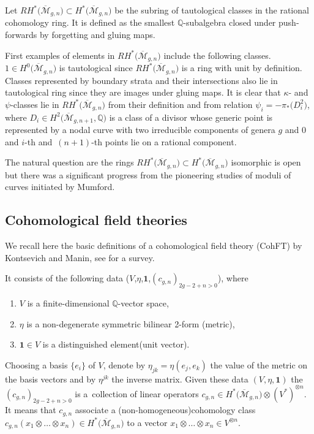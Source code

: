\documentclass[10pt,a4paper]{amsart}
\def\oM{\overline{\mathcal{M}}}
\def\b1{{\mathbf 1}}
\numberwithin{equation}{section}
\begin{document}
Let
$
RH^*\big(\oM_{g,n}\big) \subset H^*\big(\oM_{g,n}\big)
$
be the subring of tautological
classes in the rational cohomology ring. It is defined as the smallest $\mathbb{Q}$-subalgebra closed under push-forwards by forgetting and gluing maps.

First examples of elements in $RH^*\big(\oM_{g,n}\big)$ include the following classes.
$1\in H^{0}\big(\oM_{g,n}\big)$ is tautological since $RH^*\big(\oM_{g,n}\big)$ is a ring with unit by definition. Classes represented by boundary strata and their intersections also lie in tautological ring since they are images under gluing maps.
It is clear that $\kappa$- and $\psi$-classes lie in $RH^*\big(\oM_{g,n}\big)$ from their definition and from relation $\psi_i = - \pi_{*}\big(D^{2}_{i}\big)$, where $D_i \in H^{2}\big(\oM_{g,n+1},\mathbb{Q}\big)$ is a class of a divisor whose generic point is represented by a nodal curve with two irreducible components of genera $g$ and $0$ and
$i$-th and~$(n+1)$-th points lie on a rational component.

The natural question are the rings $RH^*\big(\oM_{g,n}\big) \subset H^*\big(\oM_{g,n}\big)$ isomorphic is open but there was a significant progress from the pioneering studies of moduli of curves initiated by Mumford.

\subsection{Cohomological field theories} \label{cft}
We recall here the basic definitions of a cohomological field theory (CohFT) by Kontsevich and Manin, see \cite{PPP} for a survey.

It consists of the following data ($V$,$\eta$,$\b1$,$(c_{g,n})_{2g-2+n>0}$), where
\begin{enumerate}\itemsep=0pt
\item[(i)] $V$ is a finite-dimensional $\mathbb{Q}$-vector space,
\item[(ii)]$\eta$ is a non-degenerate symmetric bilinear 2-form (metric),
\item[(iii)]$\b1\in V$ is a distinguished element(unit vector).
\end{enumerate}

Choosing a basis $\{e_i\}$ of $V$, denote by $\eta_{jk}=\eta(e_j,e_k)$ the value of the metric on the basis vectors and by $\eta^{jk}$ the inverse matrix.
Given these data $(V,\eta,\b1)$ the $(c_{g,n})_{2g-2+n > 0}$ is a~collection of linear operators
$c_{g,n} \in H^*\big(\oM_{g,n}\big) \otimes (V^*)^{\otimes n}$.
It means that $c_{g,n}$ associate a (non-homogeneous)cohomology class $c_{g,n}(x_1\otimes \dots \otimes x_n)\! \in H^*\big(\oM_{g,n}\big)$ to a vector
$x_1\otimes \dots \otimes x_n \in V^{\otimes n}$.
\end{document}
